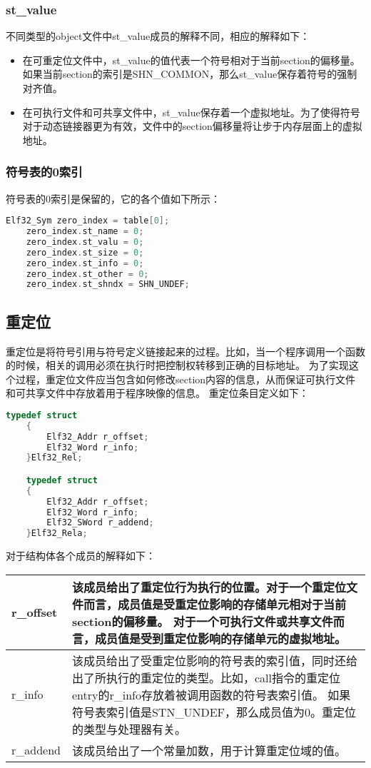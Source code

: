 \documentclass[a4paper,left=2.5cm,right=2.5cm,11pt]{article}
\newcommand{\interval}{\vspace{0.5em}}
\begin{document}
\subsubsection{st\_value}
	不同类型的object文件中st\_value成员的解释不同，相应的解释如下：
	\begin{itemize}
		\item 在可重定位文件中，st\_value的值代表一个符号相对于当前section的偏移量。如果当前section的索引是SHN\_COMMON，那么st\_value保存着符号的强制对齐值。
		\item 在可执行文件和可共享文件中，st\_value保存着一个虚拟地址。为了使得符号对于动态链接器更为有效，文件中的section偏移量将让步于内存层面上的虚拟地址。
	\end{itemize}

\subsubsection{符号表的0索引}
	符号表的0索引是保留的，它的各个值如下所示：
	\begin{lstlisting}[language = C]
	Elf32_Sym zero_index = table[0];
	zero_index.st_name = 0;
	zero_index.st_valu = 0;
	zero_index.st_size = 0;
	zero_index.st_info = 0;
	zero_index.st_other = 0;
	zero_index.st_shndx = SHN_UNDEF;
	\end{lstlisting}

\subsection{重定位}
	重定位是将符号引用与符号定义链接起来的过程。比如，当一个程序调用一个函数的时候，相关的调用必须在执行时把控制权转移到正确的目标地址。
	为了实现这个过程，重定位文件应当包含如何修改section内容的信息，从而保证可执行文件和可共享文件中存放着用于程序映像的信息。
	重定位条目定义如下：
	\begin{lstlisting}[language = C]
	typedef struct
	{
		Elf32_Addr r_offset;
		Elf32_Word r_info;
	}Elf32_Rel;

	typedef struct
	{
		Elf32_Addr r_offset;
		Elf32_Word r_info;
		Elf32_SWord r_addend;
	}Elf32_Rela;
	\end{lstlisting}

	对于结构体各个成员的解释如下：
	\interval
	\begin{longtable}{p{2cm}p{9cm}}
	\hline
	r\_offset & 该成员给出了重定位行为执行的位置。对于一个重定位文件而言，成员值是受重定位影响的存储单元相对于当前section的偏移量。
			    对于一个可执行文件或共享文件而言，成员值是受到重定位影响的存储单元的虚拟地址。\\
	\hline
	r\_info & 该成员给出了受重定位影响的符号表的索引值，同时还给出了所执行的重定位的类型。比如，call指令的重定位entry的r\_info存放着被调用函数的符号表索引值。
			  如果符号表索引值是STN\_UNDEF，那么成员值为0。重定位的类型与处理器有关。\\
	\hline
	r\_addend & 该成员给出了一个常量加数，用于计算重定位域的值。\\
	\hline
	\end{longtable}
	\interval
\end{document}
